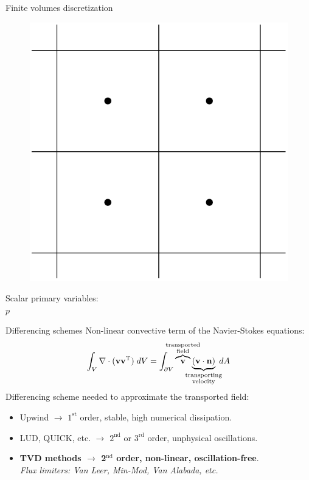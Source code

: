 \documentclass{beamer}
\begin{document}
\begin{frame}{Finite volumes discretization}
\begin{itemize}
\begin{minipage}{0.5\textwidth}
\begin{figure}
			\includegraphics[height=0.3\textheight]{cellcentred.pdf}
		\end{figure}
	\end{minipage}%
	\begin{minipage}{0.5\textwidth}
		\centering
		Scalar primary variables:\\
		$p$
	\end{minipage}%
\end{itemize}
\end{frame}
\begin{frame}{Differencing schemes}
Non-linear convective term of the Navier-Stokes equations:
\begin{equation*}
\int_V \nabla \cdot (\mathbf{v} \mathbf{v}^\mathrm{T}) \; dV = \int_{\partial 
V} 
\overbrace{\mathbf{v}}^{\substack{\text{\makebox[0pt]{transported}} 
		\\ \text{\makebox[0pt]{field}}}} \underbrace{(\mathbf{v} \cdot 
	\mathbf{n})}_{\substack{\text{\makebox[0pt]{transporting}} \\
		\text{\makebox[0pt]{velocity}}}} \; dA
\end{equation*}
Differencing scheme needed to approximate the transported field:
\begin{itemize}
	\item Upwind $\rightarrow$ $1^\text{st}$ order, stable, high numerical dissipation.
	\item LUD, QUICK, etc. $\rightarrow$ $2^\text{nd}$ or $3^\text{rd}$ order, unphysical oscillations.
	\item \textbf{TVD methods $\rightarrow$ 2$^\text{nd}$ order, non-linear, 
	oscillation-free}.\\
	\emph{Flux limiters: Van Leer, Min-Mod, Van Alabada, etc.}
\end{itemize}
\end{frame}
\end{document}
